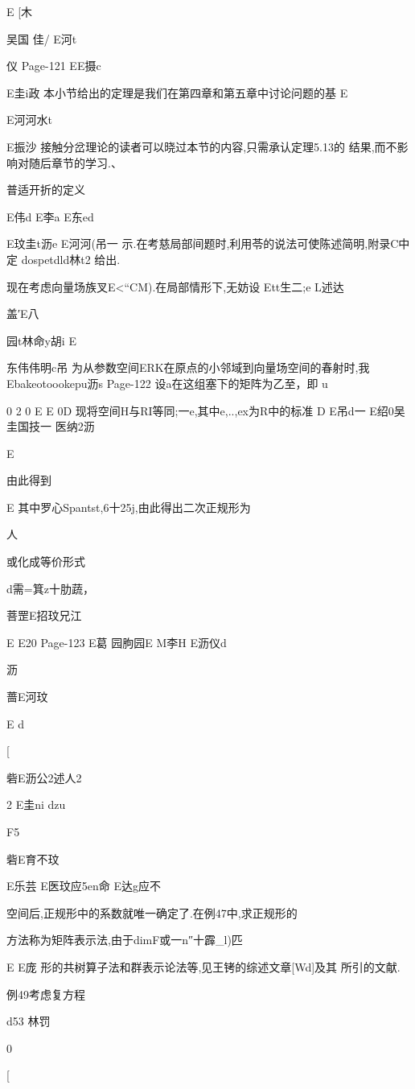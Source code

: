 {{E
[木

吴国
佳/
E河t

仪
Page-121
EE摄c

E圭i政
本小节给出的定理是我们在第四章和第五章中讨论问题的基
E

E河河水t

E振沙
接触分岔理论的读者可以晓过本节的内容,只需承认定理5.13的
结果,而不影响对随后章节的学习.、

普适开折的定义

E伟d
E李a
E东ed

E玟圭t沥e
E河河(吊一
示.在考慈局部间题时,利用苓的说法可使陈述简明,附录C中定
dospetdld林t2
给出.

现在考虑向量场族叉E<“CM).在局部情形下,无妨设
Ett生二;e
L述达

盖′E八

园t林命y胡i
E

东伟伟明c吊
为从参数空间ERK在原点的小邻域到向量场空间的春射时,我
Ebakeotoookepu沥s
Page-122
设a在这组塞下的矩阵为乙至，即
u

0
2
0
E
E
0D
现将空间H与RI等同;一e,其中e,..,ex为R中的标准
D
E吊d一
E绍0吴圭国技一
医纳2沥

E

由此得到

E
其中罗心Spantst,6十25j,由此得出二次正规形为

人

或化成等价形式

d需=箕z十肋蔬，

菩罡E招玟兄江

E
E20
Page-123
E葛
园朐园E
M李H
E沥仪d

沥

蔷E河玟

E
d

[

砦E沥公2述人2

2
E圭ni
dzu

F5

砦E育不玟

E乐芸
E医玟应5en命
E达g应不

空间后,正规形中的系数就唯一确定了.在例47中,求正规形的

方法称为矩阵表示法,由于dimF或一n″十霹_l)匹

E
E庞
形的共树算子法和群表示论法等,见王铐的综述文章[Wd]及其
所引的文献.

例49考虑复方程

d53
林罚

0

[

}}
